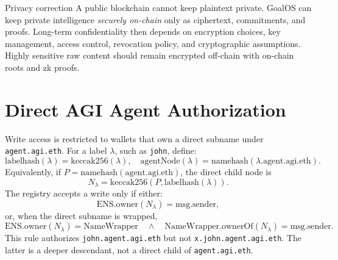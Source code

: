 \documentclass[11pt]{article}
\newcommand{\code}[1]{\texttt{#1}}
\begin{document}
\begin{warnbox}{Privacy correction}
A public blockchain cannot keep plaintext private. GoalOS can keep private intelligence \emph{securely on-chain} only as ciphertext, commitments, and proofs. Long-term confidentiality then depends on encryption choices, key management, access control, revocation policy, and cryptographic assumptions. Highly sensitive raw content should remain encrypted off-chain with on-chain roots and zk proofs.
\end{warnbox}

\section{Direct AGI Agent Authorization}
Write access is restricted to wallets that own a direct subname under \code{agent.agi.eth}. For a label \(\lambda\), such as \code{john}, define:
\[
\mathrm{labelhash}(\lambda) = \mathrm{keccak256}(\lambda),
\quad
\mathrm{agentNode}(\lambda) = \mathrm{namehash}(\lambda.\mathrm{agent}.\mathrm{agi}.\mathrm{eth}).
\]
Equivalently, if \(P=\mathrm{namehash}(\mathrm{agent}.\mathrm{agi}.\mathrm{eth})\), the direct child node is
\[
N_\lambda = \mathrm{keccak256}(P,\mathrm{labelhash}(\lambda)).
\]
The registry accepts a write only if either:
\[
\mathrm{ENS.owner}(N_\lambda)=\mathrm{msg.sender},
\]
or, when the direct subname is wrapped,
\[
\mathrm{ENS.owner}(N_\lambda)=\mathrm{NameWrapper}
\quad\wedge\quad
\mathrm{NameWrapper.ownerOf}(N_\lambda)=\mathrm{msg.sender}.
\]
This rule authorizes \code{john.agent.agi.eth} but not \code{x.john.agent.agi.eth}. The latter is a deeper descendant, not a direct child of \code{agent.agi.eth}.
\end{document}

